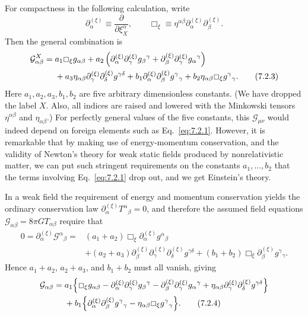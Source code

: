 For compactness in the following calculation, write
\[
  \partial^{(\xi)}_\alpha
  \equiv\frac{\partial}{\partial\xi_X^\alpha},
  \qquad
  \Box_\xi
  \equiv
  \eta^{\alpha\beta}
  \partial^{(\xi)}_\alpha\partial^{(\xi)}_\beta.
\]
Then the general combination is
\begin{align}
  \mathcal G^X_{\alpha\beta}
  ={}&
  a_1\Box_\xi g_{\alpha\beta}
  +a_2\left(
    \partial^{(\xi)}_\alpha\partial^{(\xi)}_\gamma g_\beta{}^\gamma
    +\partial^{(\xi)}_\beta\partial^{(\xi)}_\gamma g_\alpha{}^\gamma
  \right)
  \notag\\
  &+
  a_3\eta_{\alpha\beta}
  \partial^{(\xi)}_\gamma\partial^{(\xi)}_\delta g^{\gamma\delta}
  +b_1
  \partial^{(\xi)}_\alpha\partial^{(\xi)}_\beta g^\gamma{}_\gamma
  +b_2\eta_{\alpha\beta}\Box_\xi g^\gamma{}_\gamma.
  \tag{7.2.3}\label{eq:7.2.3}
\end{align}
Here \(a_1,a_2,a_3,b_1,b_2\) are five arbitrary dimensionless constants.
(We have dropped the label \(X\). Also, all indices are raised and lowered
with the Minkowski tensors \(\eta^{\alpha\beta}\) and
\(\eta_{\alpha\beta}\).) For perfectly general values of the five constants,
this \(\mathcal G_{\mu\nu}\) would indeed depend on foreign elements such as
Eq.~\eqref{eq:7.2.1}. However, it is remarkable that by making use of
energy-momentum conservation, and the validity of Newton's theory for weak
static fields produced by nonrelativistic matter, we can put such stringent
requirements on the constants \(a_1,\ldots,b_2\) that the terms involving
Eq.~\eqref{eq:7.2.1} drop out, and we get Einstein's theory.

In a weak field the requirement of energy and momentum conservation yields
the ordinary conservation law
\(\partial^{(\xi)}_\alpha T^\alpha{}_\beta=0\), and therefore the assumed
field equations
\(\mathcal G_{\alpha\beta}=8\pi G T_{\alpha\beta}\) require that
\begin{align*}
  0
  =
  \partial^{(\xi)}_\alpha\mathcal G^\alpha{}_\beta
  ={}&
  (a_1+a_2)\Box_\xi
  \partial^{(\xi)}_\alpha g^\alpha{}_\beta
  \\
  &+
  (a_2+a_3)
  \partial^{(\xi)}_\beta
  \partial^{(\xi)}_\gamma\partial^{(\xi)}_\delta g^{\gamma\delta}
  +(b_1+b_2)\Box_\xi
  \partial^{(\xi)}_\beta g^\gamma{}_\gamma.
\end{align*}
Hence \(a_1+a_2\), \(a_2+a_3\), and \(b_1+b_2\) must all vanish, giving
\begin{align}
  \mathcal G_{\alpha\beta}
  ={}&
  a_1\Bigl\{
    \Box_\xi g_{\alpha\beta}
    -\partial^{(\xi)}_\alpha\partial^{(\xi)}_\gamma g_\beta{}^\gamma
    -\partial^{(\xi)}_\beta\partial^{(\xi)}_\gamma g_\alpha{}^\gamma
    +\eta_{\alpha\beta}
     \partial^{(\xi)}_\gamma\partial^{(\xi)}_\delta g^{\gamma\delta}
  \Bigr\}
  \notag\\
  &+
  b_1\Bigl\{
    \partial^{(\xi)}_\alpha\partial^{(\xi)}_\beta g^\gamma{}_\gamma
    -\eta_{\alpha\beta}\Box_\xi g^\gamma{}_\gamma
  \Bigr\}.
  \tag{7.2.4}\label{eq:7.2.4}
\end{align}

